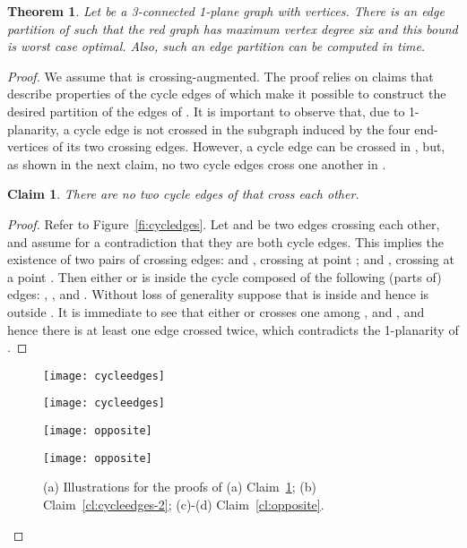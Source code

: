 \documentclass{article}
\newtheorem{claim}{Claim}
\newtheorem{theorem}{Theorem}
\begin{document}
\begin{theorem}\label{th:edge-decomposition}
Let  be a 3-connected 1-plane graph with  vertices.
There is an edge partition of  such that the red graph has maximum vertex degree six and this bound is worst case optimal. Also, such an edge partition can be computed in  time.
\end{theorem}
\begin{proof}
We assume that  is crossing-augmented. The proof relies on claims that describe properties of the cycle edges of  which  make it possible to construct the desired partition of the edges of . It is important to observe that, due to 1-planarity, a cycle edge  is not crossed in the subgraph induced by the four end-vertices of its two crossing edges. However, a cycle edge can be crossed in , but, as shown in the next claim, no two cycle edges cross one another in .

\begin{claim}\label{cl:cycleedges}
There are no two cycle edges of  that cross each other.
\end{claim}
\begin{proof}
Refer to Figure~\ref{fi:cycledges}. Let  and  be two edges crossing each other, and assume for a contradiction that they are both cycle edges. This implies the existence of two pairs of crossing edges:  and , crossing at point ;  and , crossing at a point . Then either  or  is inside the cycle  composed of the following (parts of) edges: , , and . Without loss of generality suppose that  is inside  and hence  is outside . It is immediate to see that either  or  crosses one among ,  and , and hence there is at least one edge crossed twice, which contradicts the 1-planarity of .
\end{proof}

\begin{figure}[tb]
    \centering
    \begin{minipage}[b]{.24\textwidth}
    	\centering
    	\texttt{[image: cycleedges]}
    	\subcaption{}\label{fi:cycledges}
    \end{minipage}
    \begin{minipage}[b]{.24\textwidth}
    	\centering
    	\texttt{[image: cycleedges]}
    	\subcaption{}\label{fi:cycledges-2}
    \end{minipage}
    \begin{minipage}[b]{.24\textwidth}
    	\centering
    	\texttt{[image: opposite]}
    	\subcaption{}\label{fi:opposite-a}
    \end{minipage}
    \begin{minipage}[b]{.24\textwidth}
    	\centering
    	\texttt{[image: opposite]}
    	\subcaption{}\label{fi:opposite-b}
    	\end{minipage}
    \caption{(a) Illustrations for the proofs of (a) Claim~\ref{cl:cycleedges}; (b) Claim~\ref{cl:cycleedges-2}; (c)-(d) Claim~\ref{cl:opposite}.}
\end{figure}


\end{proof}
\end{document}
